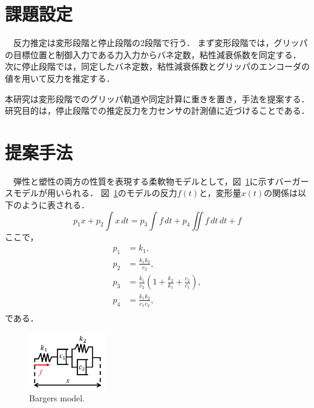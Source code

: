 \documentclass[a4paper]{jarticle}
\begin{document}
\section{課題設定}
　反力推定は変形段階と停止段階の2段階で行う．
まず変形段階では，グリッパの目標位置と制御入力である力入力からバネ定数，粘性減衰係数を同定する．
次に停止段階では，同定したバネ定数，粘性減衰係数とグリッパのエンコーダの値を用いて反力を推定する．

本研究は変形段階でのグリッパ軌道や同定計算に重きを置き，手法を提案する．
研究目的は，停止段階での推定反力を力センサの計測値に近づけることである．
\section{提案手法}
　弾性と塑性の両方の性質を表現する柔軟物モデルとして，図~\ref{fig:BS_model}に示すバーガースモデルが用いられる\cite{ref_MSD}．
図~\ref{fig:BS_model}のモデルの反力$f(t)$と，変形量$x(t)$の関係は以下のように表される．
\begin{equation}
    p_1 {x} + p_2 \int{x}\,dt = p_3\int{f}\,dt +p_4\iint{f}\,dt\,dt  + f
    \label{eq:BSmodel}
\end{equation}
ここで，
\begin{equation}
    \begin{aligned}
        p_1 &= k_1,  \\
        p_2 &= \frac{k_1 k_2}{c_2},    \\
        p_3 &= \frac{k_1}{c_2}\left(1+\frac{k_2}{k_1}+\frac{c_2}{c_1}\right),\\
        p_4 &= \frac{k_1k_2}{c_1 c_2} ,\\
    \end{aligned}
    \label{eq:p2ck}
\end{equation}
である．
\begin{figure}[tb]
    \centering
    \includegraphics[width=0.3\textwidth]{BS_model.pdf}
    \caption{Bargers model.}
    \label{fig:BS_model}
\end{figure}
\end{document}
